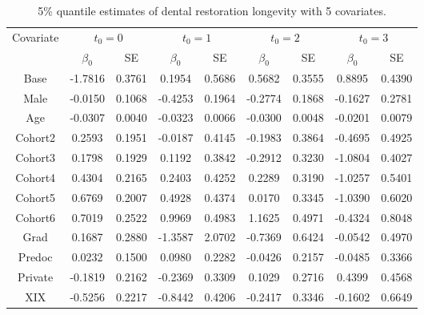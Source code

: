 \documentclass[12pt]{article}
\begin{document}
	\begin{table}[H]
		\caption{5\% quantile estimates of dental restoration longevity with 5 covariates.}
		\centering
		\begin{tabular}{|c|c|c|c|c|c|c|c|c|}
			\hline
			\multirow{2}{*}{Covariate} & \multicolumn{2}{c|}{$t_0=0$} & \multicolumn{2}{c|}{$t_0=1$} & \multicolumn{2}{c|}{$t_0=2$} & \multicolumn{2}{c|}{$t_0=3$}\\ 
			\cline{2-9}
			& $\beta_0$ & SE & $\beta_0$ & SE  & $\beta_0$ & SE & $\beta_0$ & SE\\
			\hline\hline
			Base & -1.7816 & 0.3761 & 0.1954 & 0.5686 & 0.5682 & 0.3555 & 0.8895 & 0.4390 \\ 
			Male & -0.0150 & 0.1068 & -0.4253 & 0.1964 & -0.2774 & 0.1868 & -0.1627 & 0.2781 \\ 
			Age & -0.0307 & 0.0040 & -0.0323 & 0.0066 & -0.0300 & 0.0048 & -0.0201 & 0.0079 \\ 
			Cohort2 & 0.2593 & 0.1951 & -0.0187 & 0.4145 & -0.1983 & 0.3864 & -0.4695 & 0.4925 \\ 
			Cohort3 & 0.1798 & 0.1929 & 0.1192 & 0.3842 & -0.2912 & 0.3230 & -1.0804 & 0.4027 \\ 
			Cohort4 & 0.4304 & 0.2165 & 0.2403 & 0.4252 & 0.2289 & 0.3190 & -1.0257 & 0.5401 \\ 
			Cohort5 & 0.6769 & 0.2007 & 0.4928 & 0.4374 & 0.0170 & 0.3345 & -1.0390 & 0.6020 \\ 
			Cohort6 & 0.7019 & 0.2522 & 0.9969 & 0.4983 & 1.1625 & 0.4971 & -0.4324 & 0.8048 \\ 
			Grad & 0.1687 & 0.2880 & -1.3587 & 2.0702 & -0.7369 & 0.6424 & -0.0542 & 0.4970 \\ 
			Predoc & 0.0232 & 0.1500 & 0.0980 & 0.2282 & -0.0426 & 0.2157 & -0.0485 & 0.3366 \\ 
			Private & -0.1819 & 0.2162 & -0.2369 & 0.3309 & 0.1029 & 0.2716 & 0.4399 & 0.4568 \\ 
			XIX & -0.5256 & 0.2217 & -0.8442 & 0.4206 & -0.2417 & 0.3346 & -0.1602 & 0.6649 \\ 
			\hline
		\end{tabular}
	\end{table}
\end{document}
